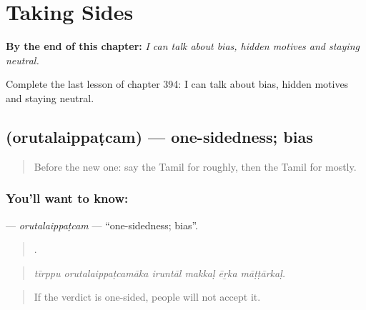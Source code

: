 
\chapter{Taking Sides}
\label{ch:ta-taking-sides}

\begin{chapteropening}
\textbf{By the end of this chapter:} \emph{I can talk about bias, hidden motives and staying neutral.}

Complete the last lesson of chapter 394: I can talk about bias, hidden motives and staying neutral.
\end{chapteropening}

\section[\texorpdfstring{\ta{ஒருதலைப்பட்சம்} (orutalaippaṭcam)}{ஒருதலைப்பட்சம் (orutalaippaṭcam)}]{ (orutalaippaṭcam) — one-sidedness; bias}

\label{lesson:TA-C394-orutalaippatcam}



\begin{quote}
Before the new one: say the Tamil for roughly, then the Tamil for mostly.
\end{quote}

\subsection*{You'll want to know: }
\textbf{} — \emph{orutalaippaṭcam} — \textquotedblleft{}one-sidedness; bias\textquotedblright{}.

\begin{quote}
     .
\end{quote}

\begin{quote}
\emph{tīrppu orutalaippaṭcamāka iruntāl makkaḷ ēṟka māṭṭārkaḷ.}
\end{quote}

\begin{quote}
If the verdict is one-sided, people will not accept it.
\end{quote}

